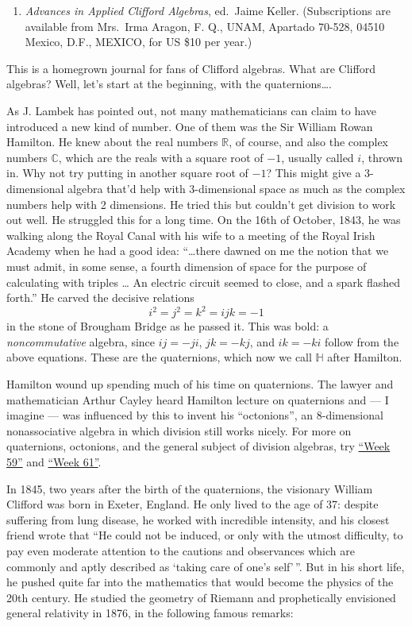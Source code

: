 \documentclass{article}
\def\tightlist{}
\begin{document}
\begin{enumerate}
\def\labelenumi{\arabic{enumi})}
\tightlist
\item
  \emph{Advances in Applied Clifford Algebras}, ed.~Jaime Keller.
  (Subscriptions are available from Mrs.~Irma Aragon, F. Q., UNAM,
  Apartado 70-528, 04510 Mexico, D.F., MEXICO, for US \$10 per year.)
\end{enumerate}

This is a homegrown journal for fans of Clifford algebras. What are
Clifford algebras? Well, let's start at the beginning, with the
quaternions\ldots.

As J. Lambek has pointed out, not many mathematicians can claim to have
introduced a new kind of number. One of them was the Sir William Rowan
Hamilton. He knew about the real numbers \(\mathbb{R}\), of course, and
also the complex numbers \(\mathbb{C}\), which are the reals with a
square root of \(-1\), usually called \(i\), thrown in. Why not try
putting in another square root of \(-1\)? This might give a
3-dimensional algebra that'd help with 3-dimensional space as much as
the complex numbers help with 2 dimensions. He tried this but couldn't
get division to work out well. He struggled this for a long time. On the
16th of October, 1843, he was walking along the Royal Canal with his
wife to a meeting of the Royal Irish Academy when he had a good idea:
``\ldots there dawned on me the notion that we must admit, in some
sense, a fourth dimension of space for the purpose of calculating with
triples \ldots{} An electric circuit seemed to close, and a spark
flashed forth.'' He carved the decisive relations
\[i^2 = j^2 = k^2 = ijk = -1\] in the stone of Brougham Bridge as he
passed it. This was bold: a \emph{noncommutative} algebra, since
\(ij = -ji\), \(jk = -kj\), and \(ik = -ki\) follow from the above
equations. These are the quaternions, which now we call \(\mathbb{H}\)
after Hamilton.

Hamilton wound up spending much of his time on quaternions. The lawyer
and mathematician Arthur Cayley heard Hamilton lecture on quaternions
and --- I imagine --- was influenced by this to invent his
``octonions'', an 8-dimensional nonassociative algebra in which division
still works nicely. For more on quaternions, octonions, and the general
subject of division algebras, try \protect\hyperlink{week59}{``Week
59''} and \protect\hyperlink{week61}{``Week 61''}.

In 1845, two years after the birth of the quaternions, the visionary
William Clifford was born in Exeter, England. He only lived to the age
of 37: despite suffering from lung disease, he worked with incredible
intensity, and his closest friend wrote that ``He could not be induced,
or only with the utmost difficulty, to pay even moderate attention to
the cautions and observances which are commonly and aptly described as
`taking care of one's self'\,''. But in his short life, he pushed quite
far into the mathematics that would become the physics of the 20th
century. He studied the geometry of Riemann and prophetically envisioned
general relativity in 1876, in the following famous remarks:
\end{document}
